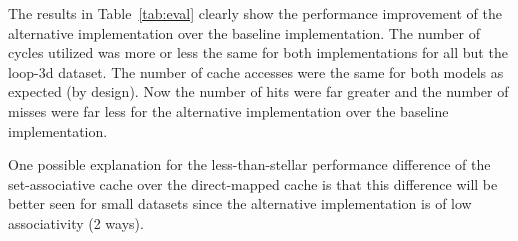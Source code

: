 \documentclass[10pt]{article}
\begin{document}
The results in Table~\ref{tab:eval} clearly show the performance improvement of the alternative implementation over the baseline implementation. The number of cycles utilized was more or less the same for both implementations for all but the loop-3d dataset. The number of cache accesses were the same for both models as expected (by design). Now the number of hits were far greater and the number of misses were far less for the alternative implementation over the baseline implementation. 

One possible explanation for the less-than-stellar performance difference of the set-associative cache over the direct-mapped cache is that this difference will be better seen for small datasets since the alternative implementation is of low associativity (2 ways).  



\end{document}
